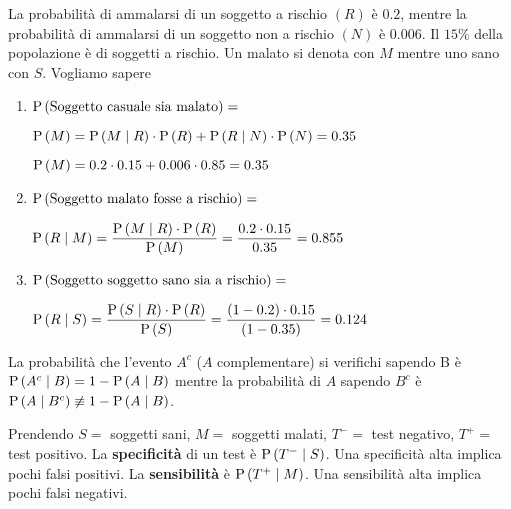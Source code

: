\begin{exrc}
	La probabilit\`a di ammalarsi di un soggetto a rischio $ (R) $ \`e $ 0.2 $, mentre la probabilit\`a di ammalarsi di un soggetto non a rischio $ (N) $ \`e $ 0.006 $. Il $ 15\% $ della popolazione \`e di soggetti a rischio. Un malato si denota con $ M $ mentre uno sano con $ S $. Vogliamo sapere

	\begin{enumerate}
		\item $ \text{P}\left(\text{Soggetto casuale sia malato}\right) = $
		
		$ \text{P}\left(M\right) = \text{P}\left(M \mid R\right) \cdot \text{P}\left(R\right) + \text{P}\left(R \mid N\right) \cdot \text{P}\left(N\right) = 0.35 $ 
		
		$ \text{P}\left(M\right) = 0.2 \cdot 0.15 + 0.006 \cdot 0.85 = 0.35 $
		
		\item $ \text{P}\left(\text{Soggetto malato fosse a rischio}\right) = $
		
		$ \text{P}\left(R \mid M\right) = \dfrac{\text{P}\left(M \mid R\right) \cdot \text{P}\left(R\right)}{\text{P}\left(M\right)} = \dfrac{0.2 \cdot 0.15}{0.35} = 0.855 $
		
		\item $ \text{P}\left(\text{Soggetto soggetto sano sia a rischio}\right) = $
		
		$ \text{P}\left(R \mid S\right) = \dfrac{\text{P}\left(S \mid R\right) \cdot \text{P}\left(R\right)}{\text{P}\left(S\right)} = \dfrac{(1-0.2) \cdot 0.15}{(1-0.35)} = 0.124$
	\end{enumerate}
	
	\begin{note}
		La probabilit\`a che l'evento $ A^c $ ($ A $ complementare) si verifichi sapendo B \`e $ \text{P}\left(A^c \mid B\right) = 1 - \text{P}\left(A \mid B\right) $ 
		mentre la probabilit\`a di $ A $ sapendo $ B^c $ \`e $ \text{P}\left(A \mid B^c\right) \not\equiv 1 - \text{P}\left(A \mid B\right) $.
	\end{note}

	\begin{defn}
		Prendendo $ S = $ soggetti sani, $ M = $ soggetti malati, $ T^- = $ test negativo, $ T^+ = $ test positivo. 
		La \textbf{specificit\`a} di un test \`e $ \text{P}\left(T^- \mid S\right) $. Una specificit\`a alta implica pochi falsi positivi. 
		La \textbf{sensibilit\`a} \`e $ \text{P}\left(T^+ \mid M\right) $. Una sensibilit\`a alta implica pochi falsi negativi.
	\end{defn}
\end{exrc}


